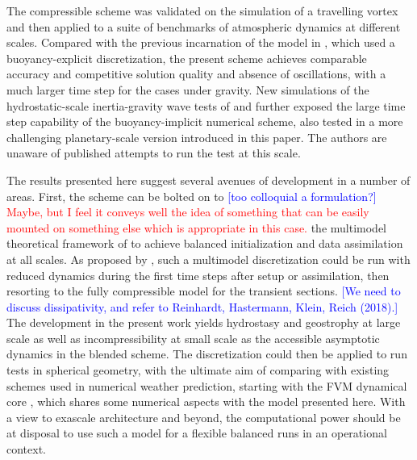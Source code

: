 \documentclass{ametsoc}
\theoremstyle{definition}
\newcommand{\klein}[1]{\textcolor{blue}{#1}}
\newcommand{\benacchio}[1]{\textcolor{red}{#1}}
\begin{document}
The compressible scheme was validated on the simulation of a travelling vortex and then applied to a suite of benchmarks of atmospheric dynamics at different scales. Compared with the previous incarnation of the model in \cite{Benacchio2014, BenacchioEtAl2014}, which used a buoyancy-explicit discretization, the present scheme achieves comparable accuracy and competitive solution quality and absence of oscillations, with a much larger time step for the cases under gravity. New simulations of the hydrostatic-scale inertia-gravity wave tests of \cite{BaldaufBrdar2013} and \cite{SkamarockKlemp1994} further exposed the large time step capability of the buoyancy-implicit numerical scheme, also tested in a more challenging planetary-scale version introduced in this paper. The authors are unaware of published attempts to run the test at this scale.

The results presented here suggest several avenues of development in a number of areas. First, the scheme can be bolted on to \klein{[too colloquial a formulation?]} \benacchio{Maybe, but I feel it conveys well the idea of something that can be easily mounted on something else which is appropriate in this case.} the multimodel theoretical framework of \cite{KleinBenacchio2016} to achieve balanced initialization and data assimilation at all scales. As proposed by \cite{BenacchioEtAl2014}, such a multimodel discretization could be run with reduced dynamics during the first time steps after setup or assimilation, then resorting to the fully compressible model for the transient sections. \klein{[We need to discuss dissipativity, and refer to Reinhardt, Hastermann, Klein, Reich (2018).]} The development in the present work yields hydrostasy and geostrophy at large scale as well as incompressibility at small scale as the accessible asymptotic dynamics in the blended scheme. The discretization could then be applied to run tests in spherical geometry, with the ultimate aim of comparing with existing schemes used in numerical weather prediction, starting with the FVM dynamical core \citep{KuehnleinEtAl2018}, which shares some numerical aspects with the model presented here. With a view to exascale architecture and beyond, the computational power should be at disposal to use such a model for a flexible balanced runs in an operational context.
\end{document}
